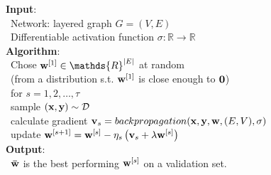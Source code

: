 \documentclass[12pt]{report}
\theoremstyle{plain}
\newcommand\mcl[1]{\mathcal{#1}}
\begin{document}
\begin{flushleft}
\begin{tcolorbox}
	\textbf{Input}:\\
	\-\ \quad Network: layered graph $G=(V,E)$\\
	\-\ \quad Differentiable activation function $\sigma:\mathds{R}\to\mathds{R}$\\
	
	\textbf{Algorithm}:\\
	\-\ \quad Chose $\vb{w}^{[1]}\in\mathds{R}^{\abs{E}}$ at random\\
	\-\ \quad\qquad (from a distribution s.t. $\vb{w}^{[1]}$ is close enough to $\vb{0}$)\\
	\-\ \quad for $s=1,2,\dots,\tau$\\
	\-\ \qquad\quad sample $(\vb{x},\vb{y})\sim\mcl{D}$\\
	\-\ \qquad\quad calculate gradient $\vb{v}_s = backpropagation(\vb{x},\vb{y},\vb{w},(E,V),\sigma)$\\
	\-\ \qquad\quad update $\vb{w}^{[s+1]}=\vb{w}^{[s]}-\eta_s\left(\vb{v}_s+\lambda\vb{w}^{[s]}\right)$\\
	
	\textbf{Output}:\\
	\-\ \quad $\vb{\bar{w}}$ is the best performing $\vb{w}^{[s]}$ on a validation set.
	
	\label{box:NN_SGD}
\end{tcolorbox}


\end{flushleft}
\end{document}
